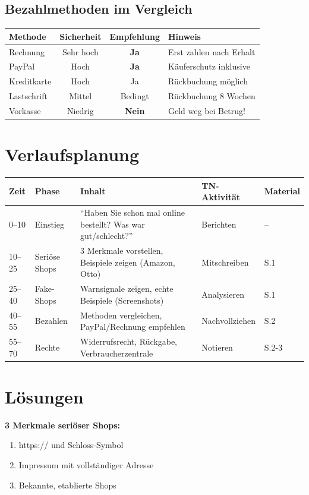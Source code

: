 \documentclass[11pt,a4paper]{article}
\begin{document}
\subsection{Bezahlmethoden im Vergleich}
\begin{tabular}{|l|c|c|p{4cm}|}
\hline
\textbf{Methode} & \textbf{Sicherheit} & \textbf{Empfehlung} & \textbf{Hinweis} \\
\hline
Rechnung & Sehr hoch & \textcolor{successgreen}{\textbf{Ja}} & Erst zahlen nach Erhalt \\
PayPal & Hoch & \textcolor{successgreen}{\textbf{Ja}} & Käuferschutz inklusive \\
Kreditkarte & Hoch & Ja & Rückbuchung möglich \\
Lastschrift & Mittel & Bedingt & Rückbuchung 8 Wochen \\
Vorkasse & Niedrig & \textcolor{warnred}{\textbf{Nein}} & Geld weg bei Betrug! \\
\hline
\end{tabular}

\section{Verlaufsplanung}

\begin{longtable}{|p{1cm}|p{2cm}|p{5cm}|p{3cm}|p{2cm}|}
\hline
\textbf{Zeit} & \textbf{Phase} & \textbf{Inhalt} & \textbf{TN-Aktivität} & \textbf{Material} \\
\hline
0--10 & Einstieg & ``Haben Sie schon mal online bestellt? Was war gut/schlecht?'' & Berichten & -- \\
\hline
10--25 & Seriöse Shops & 3 Merkmale vorstellen, Beispiele zeigen (Amazon, Otto) & Mitschreiben & S.1 \\
\hline
25--40 & Fake-Shops & Warnsignale zeigen, echte Beispiele (Screenshots) & Analysieren & S.1 \\
\hline
40--55 & Bezahlen & Methoden vergleichen, PayPal/Rechnung empfehlen & Nachvollziehen & S.2 \\
\hline
55--70 & Rechte & Widerrufsrecht, Rückgabe, Verbraucherzentrale & Notieren & S.2-3 \\
\hline
\end{longtable}

\section{Lösungen}

\textbf{3 Merkmale seriöser Shops:}
\begin{enumerate}
    \item https:// und Schloss-Symbol
    \item Impressum mit vollständiger Adresse
    \item Bekannte, etablierte Shops
\end{enumerate}
\end{document}
